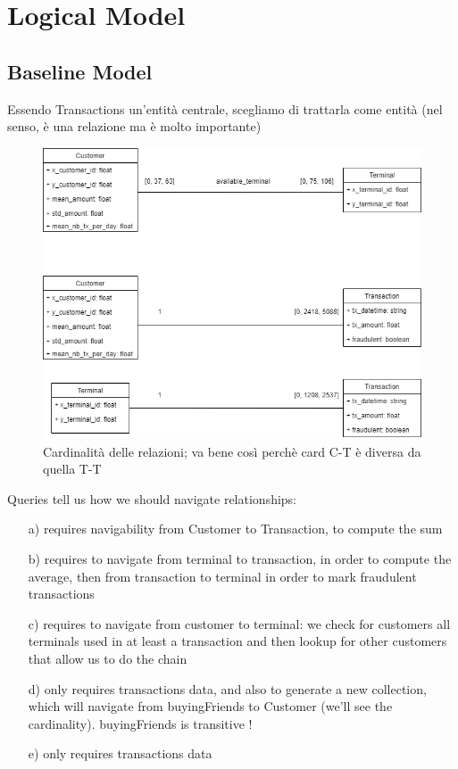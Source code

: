 \documentclass[runningheads]{llncs}
\begin{document}
\section{Logical Model}
\subsection{Baseline Model}
Essendo Transactions un'entità centrale, scegliamo di trattarla come entità (nel senso, è una relazione ma è molto importante)\\
\begin{figure}[!htb] 
        \centering \includegraphics[width=0.9\columnwidth]{images/MongoCardinality.png}
        \caption{\label{fig2}Cardinalità delle relazioni; va bene così perchè card C-T è diversa da quella T-T}
\end{figure}
Queries tell us how we should navigate relationships:
\begin{enumerate}
    \item[a)] requires navigability from Customer to Transaction, to compute the sum
    \item[b)] requires to navigate from terminal to transaction, in order to compute the average, then from transaction to terminal in order to mark fraudulent transactions
    \item[c)] requires to navigate from customer to terminal: we check for customers all terminals used in at least a transaction and then lookup for other customers that allow us to do the chain
    \item[d)] only requires transactions data, and also to generate a new collection, which will navigate from buyingFriends to Customer (we'll see the cardinality). buyingFriends is transitive !
    \item[e)] only requires transactions data
\end{enumerate}
\end{document}
